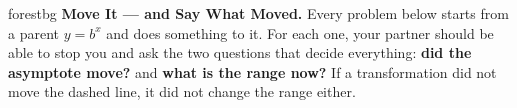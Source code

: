 \documentclass[10pt]{article}
\begin{document}
\namepartnerperiod

\vspace{0.08in}

\begin{headlinebox}{forestbg}
\small\textbf{Move It --- and Say What Moved.} Every problem below starts from a parent $y=b^{x}$ and
does something to it. For each one, your partner should be able to stop you and ask the two questions
that decide everything: \textbf{did the asymptote move?} and \textbf{what is the range now?} If a
transformation did not move the dashed line, it did not change the range either.
\end{headlinebox}

\vspace{0.06in}
\end{document}
